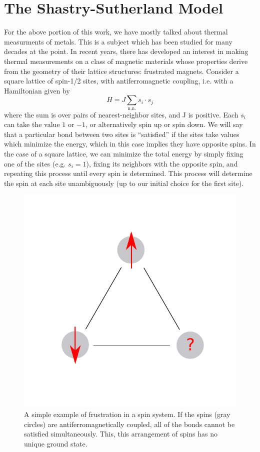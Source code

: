 \documentclass{thesis-umich}
\begin{document}
\section{The Shastry-Sutherland Model}
For the above portion of this work, we have mostly talked about thermal measurments of metals. This is a subject which has been studied for many decades at the point. In recent years, there has developed an interest in making thermal measurements on a class of magnetic materials whose properties derive from the geometry of their lattice structures: frustrated magnets. Consider a square lattice of spin-1/2 sites, with antiferromagnetic coupling, i.e. with a Hamiltonian given by
\[ H = J \sum_{\mathrm{n.n.}} s_i \cdot s_j\]
where the sum is over pairs of nearest-neighbor sites, and J is positive. Each $s_i$ can take the value $1$ or $-1$, or alternatively spin up or spin down. We will say that a particular bond between two sites is ``satisfied'' if the sites take values which minimize the energy, which in this case implies they have opposite spins. In the case of a square lattice, we can minimize the total energy by simply fixing one of the sites (e.g. $s_i = 1$), fixing its neighbors with the opposite spin, and repeating this process until every spin is determined. This process will determine the spin at each site unambiguously (up to our initial choice for the first site).
\begin{figure}
	\centering
	\caption[Frustration]{A simple example of frustration in a spin system. If the spins (gray circles) are antiferromagnetically coupled, all of the bonds cannot be satisfied simultaneously. This, this arrangement of spins has no unique ground state.}
	\label{fig:frustration}
	\includegraphics[width=0.6\columnwidth]{figures/frustration.pdf}
\end{figure}
\end{document}
